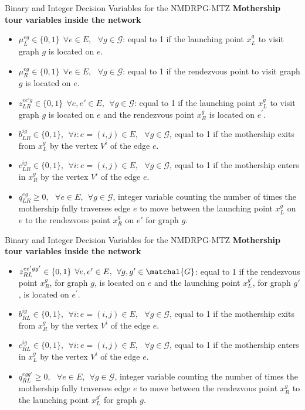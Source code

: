 \documentclass[slidestop,usepdftitle=false,10pt]{beamer}
\begin{document}
    \begin{frame}{{\large Binary and Integer Decision Variables for the NMDRPG-MTZ}}
    \textbf{Mothership tour variables inside the network}
    \small
    \begin{itemize}
        \item $\mu_{L}^{eg} \in \{0, 1\}\:\: \forall e \in E, \:\:\ \forall g \in \mathcal{G}$: equal to 1 if the launching point $x_L^g$ to visit graph $g$ is located on $e$.
        \item $\mu_{R}^{eg} \in \{0, 1\}\:\: \forall e \in E, \:\:\ \forall g \in \mathcal{G}$: equal to 1 if the rendezvous point to visit graph $g$ is located on $e$. 
        \item $z_{LR}^{ee'g} \in \{0,1\} \:\: \forall e, e' \in E, \:\:\forall g \in \mathcal{G}$: equal to 1 if the launching point $x_L^g$  to visit graph $g$ is located on $e$ and the rendezvous point $x_R^g$ is located on $e^{\prime}$.
        \item $b_{LR}^{ig} \in \{0,1\}, \:\: \forall i: e=(i,j) \in E, \:\:\ \forall g \in \mathcal G$, equal to 1 if the mothership exits from $x_L^g$ by the vertex $V^i$ of the edge $e$.
        \item $c_{LR}^{ig} \in \{0,1\}, \:\: \forall i: e=(i,j) \in E, \:\:\ \forall g \in \mathcal G$, equal to 1 if the mothership enters in $x_R^g$ by the vertex $V^i$ of the edge $e$.
        \item $q_{LR}^{eg}\geq 0, \:\:\ \forall e \in E, \:\: \forall g \in \mathcal{G}$, integer variable counting the number of times the mothership fully traverses   edge $e$ to move between the launching point $x_L^g$ on $e$ to the rendezvous point $x_R^g$ on $e'$ for graph $g$.
    \end{itemize}
    \end{frame}
    
    \begin{frame}{{\large Binary and Integer Decision Variables for the NMDRPG-MTZ}}
    \textbf{Mothership tour variables inside the network}
    \begin{itemize}
        \item $z_{RL}^{ee'gg'} \in \{0,1\} \:\: \forall e, e' \in E, \:\: \forall g, g' \in \matchal{G}$: equal to 1 if the rendezvous point $x_R^g$, for graph $g$, is located on $e$  and the launching point $x_L^{g'}$, for graph $g'$, is located on $e^{\prime}$.
        \item $b_{RL}^{ig} \in \{0,1\}, \:\: \forall i: e=(i,j) \in E, \:\:\ \forall g \in \mathcal G$, equal to 1 if the mothership exits from $x_R^g$ by the vertex $V^i$ of the edge $e$.
        \item $c_{RL}^{ig} \in \{0,1\}, \:\: \forall i: e=(i,j) \in E, \:\:\ \forall g \in \mathcal G$, equal to 1 if the mothership enters in $x_L^g$ by the vertex $V^i$ of the edge $e$.
        \item $q_{RL}^{egg'}\geq 0, \:\:\ \forall e \in E, \:\: \forall g \in \mathcal{G}$, integer variable counting the number of times the mothership fully traverses   edge $e$ to move between the rendezvous point $x_R^g$ to the launching point $x_L^{g'}$ for graph $g$.
    \end{itemize}
    \end{frame}
    
\end{document}
